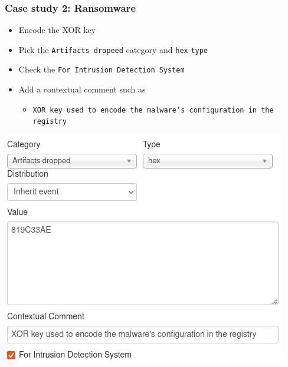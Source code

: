 \begin{frame}
    \frametitle{Case study 2: Ransomware}
    \begin{itemize}
        \item Encode the XOR key
        \item Pick the \texttt{Artifacts dropeed} category and \texttt{hex}  \texttt{type}
        \item Check the \texttt{For Intrusion Detection System}
        \item Add a contextual comment such as
        \begin{itemize}
            \item \texttt{XOR key used to encode the malware's configuration in the registry}
        \end{itemize}
    \end{itemize}
    \begin{center}
        \includegraphics[width=0.47\linewidth]{pictures/case2/attribute-key.png}
    \end{center}
\end{frame}

